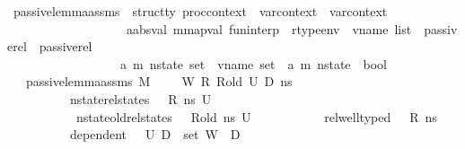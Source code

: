 \begin{isabellebody}
\isanewline
{}\isamarkupfalse%
\ passive{\isacharunderscore}{\kern0pt}lemma{\isacharunderscore}{\kern0pt}assms\ {\isacharcolon}{\kern0pt}{\isacharcolon}{\kern0pt}\ {\isachardoublequoteopen}{\isacharprime}{\kern0pt}struct{\isacharunderscore}{\kern0pt}ty\ proc{\isacharunderscore}{\kern0pt}context\ {\isasymRightarrow}\ var{\isacharunderscore}{\kern0pt}context\ {\isasymRightarrow}\ var{\isacharunderscore}{\kern0pt}context\ {\isasymRightarrow}\ \isanewline
\ \ \ \ \ \ \ \ \ \ \ \ \ \ \ \ \ \ \ {\isacharparenleft}{\kern0pt}{\isacharprime}{\kern0pt}a{\isacharcolon}{\kern0pt}{\isacharcolon}{\kern0pt}absval{\isacharcomma}{\kern0pt}\ {\isacharprime}{\kern0pt}m{\isacharcolon}{\kern0pt}{\isacharcolon}{\kern0pt}mapval{\isacharparenright}{\kern0pt}\ fun{\isacharunderscore}{\kern0pt}interp\ {\isasymRightarrow}\ rtype{\isacharunderscore}{\kern0pt}env\ {\isasymRightarrow}\ vname\ list\ {\isasymRightarrow}\ passive{\isacharunderscore}{\kern0pt}rel\ {\isasymRightarrow}\ passive{\isacharunderscore}{\kern0pt}rel\ {\isasymRightarrow}\ \isanewline
\ \ \ \ \ \ \ \ \ \ \ \ \ \ \ \ \ \ {\isacharparenleft}{\kern0pt}{\isacharparenleft}{\kern0pt}{\isacharprime}{\kern0pt}a{\isacharcomma}{\kern0pt}\ {\isacharprime}{\kern0pt}m{\isacharparenright}{\kern0pt}\ nstate{\isacharparenright}{\kern0pt}\ set\ {\isasymRightarrow}\ vname\ set\ {\isasymRightarrow}\ {\isacharparenleft}{\kern0pt}{\isacharprime}{\kern0pt}a{\isacharcomma}{\kern0pt}\ {\isacharprime}{\kern0pt}m{\isacharparenright}{\kern0pt}\ nstate\ {\isasymRightarrow}\ bool{\isachardoublequoteclose}\isanewline
\ \ \ {\isachardoublequoteopen}passive{\isacharunderscore}{\kern0pt}lemma{\isacharunderscore}{\kern0pt}assms\ M\ {\isasymLambda}\ {\isasymLambda}{\isacharprime}{\kern0pt}\ {\isasymGamma}\ {\isasymOmega}\ W\ R\ R{\isacharunderscore}{\kern0pt}old\ U{}\ D{}\ ns\ {\isacharequal}{\kern0pt}\ \isanewline
\ \ \ \ \ \ \ \ \ \ {\isacharparenleft}{\kern0pt}nstate{\isacharunderscore}{\kern0pt}rel{\isacharunderscore}{\kern0pt}states\ {\isasymLambda}\ {\isasymLambda}{\isacharprime}{\kern0pt}\ R\ ns\ U{}\ {\isasymand}\ \isanewline
\ \ \ \ \ \ \ \ \ \ \ nstate{\isacharunderscore}{\kern0pt}old{\isacharunderscore}{\kern0pt}rel{\isacharunderscore}{\kern0pt}states\ {\isasymLambda}\ {\isasymLambda}{\isacharprime}{\kern0pt}\ R{\isacharunderscore}{\kern0pt}old\ ns\ U{}\ {\isasymand}\isanewline
\ \ \ \ \ \ \ \ \ \ rel{\isacharunderscore}{\kern0pt}well{\isacharunderscore}{\kern0pt}typed\ {\isasymLambda}\ {\isasymOmega}\ R\ ns\ {\isasymand}\isanewline
\ \ \ \ \ \ \ \ \ \ dependent\ {\isasymLambda}{\isacharprime}{\kern0pt}\ {\isasymOmega}\ U{}\ D{}\ {\isasymand}\ {\isacharparenleft}{\kern0pt}set\ W{\isacharparenright}{\kern0pt}\ {\isasyminter}\ D{}\ {\isacharequal}{\kern0pt}\ {\isacharbraceleft}{\kern0pt}{\isacharbraceright}{\kern0pt}\ {\isasymand}\isanewline

\end{isabellebody}
